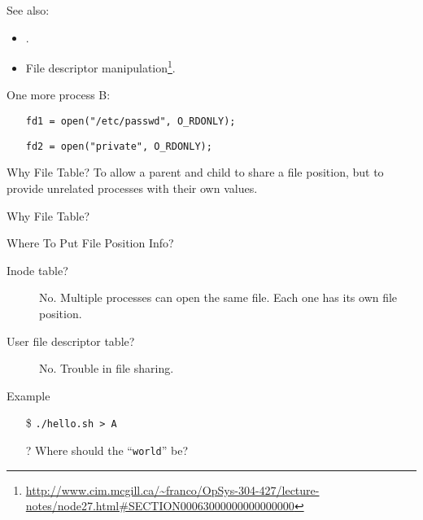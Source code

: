 See also:
\begin{itemize}
\item {}.
\item File descriptor
  manipulation\footnote{\url{http://www.cim.mcgill.ca/~franco/OpSys-304-427/lecture-notes/node27.html\#SECTION00063000000000000000}}.
\end{itemize}

\begin{frame}
  \begin{block}{One more process B:}
    \begin{itemize}
    \item[] \texttt{fd1 = open("/etc/passwd", O\_RDONLY);}
    \item[] \texttt{fd2 = open("private", O\_RDONLY);}
    \end{itemize}
  \end{block}
  \centering
\end{frame}

\begin{frame}{Why File Table?}
  To allow a parent and child to share a file position, but to provide unrelated processes
  with their own values.
  \label{fig:filetable}
  \centering
  \mode<beamer>{ \texttt{[image: mos-10-33]} }%
\end{frame}

\begin{frame}{Why File Table?}
  \begin{block}{Where To Put File Position Info?}
    \begin{description}
    \item[Inode table?] No. Multiple processes can open the same file. Each one has its
      own file position.
    \item[User file descriptor table?] No. Trouble in file sharing.
    \end{description}
  \end{block}
  \begin{block}{Example}
    \begin{minipage}{.22\textwidth}
      \begin{center}
      \end{center}
    \end{minipage}\qquad
    \begin{minipage}{.7\textwidth}
      \begin{itemize}
        \item[\$] \texttt{./hello.sh > A}
        \item[?] Where should the ``\texttt{world}'' be?
      \end{itemize}
    \end{minipage}
  \end{block}
\end{frame}

